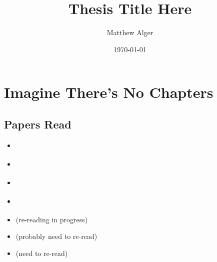\documentclass[11pt]{book}
\title{Thesis Title Here}
\author{Matthew Alger}
\date{\today}
\begin{document}
\pagestyle{empty}
\thispagestyle{empty}




\cleardoublepage
\pagestyle{empty}


\cleardoublepage
\pagestyle{empty}


\cleardoublepage
\pagestyle{headings}


\cleardoublepage
\pagestyle{headings}
\tableofcontents

\mainmatter

% 

% 
% 

\chapter{Imagine There's No Chapters}

\section{Papers Read}
\label{sec:papers}
  
  \begin{itemize}
    \item \citet{banfield15}
    \item \citet{yan10}
    \item \citet{yan11}
    \item \citet{dasgupta11}
    \item \citet{mozafari12} (re-reading in progress)
    \item \citet{fan15} (probably need to re-read)
    \item \citet{freund97} (need to re-read)
  \end{itemize}
\end{document}
